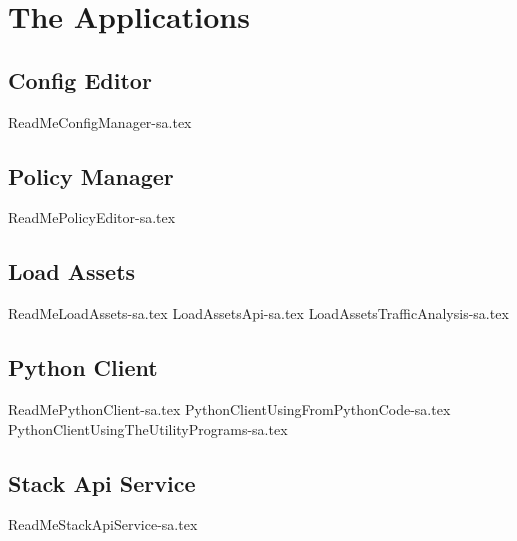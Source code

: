 
\chapter{The Applications}
\label{intro05} %


\section{Config Editor}
{ReadMeConfigManager-sa.tex}

\section{Policy Manager}
{ReadMePolicyEditor-sa.tex}

\section{Load Assets}
{ReadMeLoadAssets-sa.tex}
{LoadAssetsApi-sa.tex}
{LoadAssetsTrafficAnalysis-sa.tex}

\section{Python Client}
{ReadMePythonClient-sa.tex}
{PythonClientUsingFromPythonCode-sa.tex}
{PythonClientUsingTheUtilityPrograms-sa.tex}

\section{Stack Api Service}
{ReadMeStackApiService-sa.tex}

